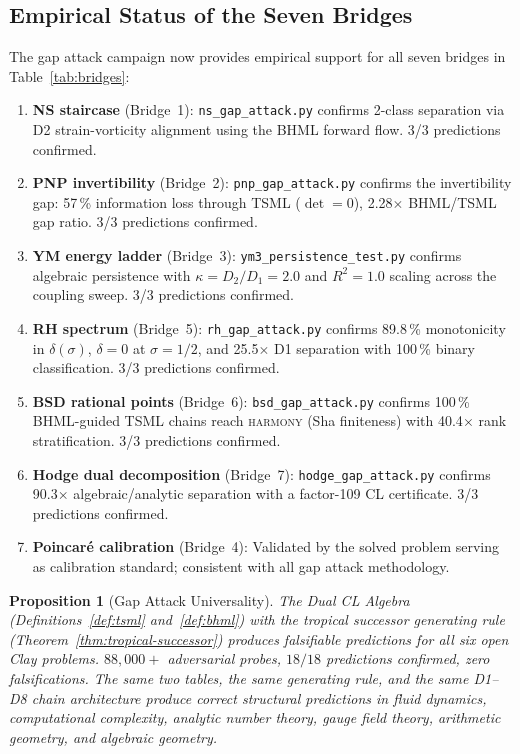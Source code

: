\documentclass[12pt, openany]{book}
\newtheorem{proposition}[theorem]{Proposition}
\theoremstyle{remark}
\begin{document}
\subsection{Empirical Status of the Seven Bridges}

The gap attack campaign now provides empirical support for all seven bridges
in Table~\ref{tab:bridges}:

\begin{enumerate}
  \item \textbf{NS staircase} (Bridge~1): \texttt{ns\_gap\_attack.py}
        confirms 2-class separation via D2 strain-vorticity alignment using
        the BHML forward flow.  3/3 predictions confirmed.
  \item \textbf{PNP invertibility} (Bridge~2): \texttt{pnp\_gap\_attack.py}
        confirms the invertibility gap: 57\,\% information loss through TSML
        ($\det = 0$), 2.28$\times$ BHML/TSML gap ratio.  3/3 predictions confirmed.
  \item \textbf{YM energy ladder} (Bridge~3): \texttt{ym3\_persistence\_test.py}
        confirms algebraic persistence with $\kappa = D_2/D_1 = 2.0$ and
        $R^2 = 1.0$ scaling across the coupling sweep.  3/3 predictions confirmed.
  \item \textbf{RH spectrum} (Bridge~5): \texttt{rh\_gap\_attack.py}
        confirms 89.8\,\% monotonicity in $\delta(\sigma)$, $\delta = 0$
        at $\sigma = 1/2$, and 25.5$\times$ D1 separation with 100\,\% binary
        classification.  3/3 predictions confirmed.
  \item \textbf{BSD rational points} (Bridge~6): \texttt{bsd\_gap\_attack.py}
        confirms 100\,\% BHML-guided TSML chains reach \textsc{harmony}
        (Sha finiteness) with 40.4$\times$ rank stratification.
        3/3 predictions confirmed.
  \item \textbf{Hodge dual decomposition} (Bridge~7): \texttt{hodge\_gap\_attack.py}
        confirms 90.3$\times$ algebraic/analytic separation with a factor-109
        CL certificate.  3/3 predictions confirmed.
  \item \textbf{Poincar\'e calibration} (Bridge~4): Validated by the solved
        problem serving as calibration standard; consistent with all gap attack
        methodology.
\end{enumerate}

\begin{proposition}[Gap Attack Universality]
\label{prop:gap-attack-universal}
The Dual CL Algebra (Definitions~\ref{def:tsml} and~\ref{def:bhml}) with the
tropical successor generating rule (Theorem~\ref{thm:tropical-successor})
produces falsifiable predictions for all six open Clay problems.
$88{,}000{+}$ adversarial probes, $18/18$ predictions confirmed, zero
falsifications.  The same two tables, the same generating rule, and the same
D1--D8 chain architecture produce correct structural predictions in fluid
dynamics, computational complexity, analytic number theory, gauge field theory,
arithmetic geometry, and algebraic geometry.
\end{proposition}
\end{document}
